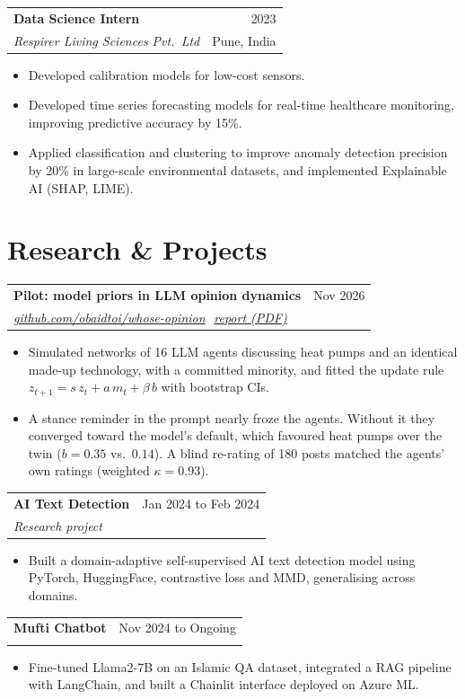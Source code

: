 \documentclass[11pt,a4paper]{article}
\makeatletter
\newcommand{\sep}{\,{\color{soft}\textperiodcentered}\,\allowbreak}
\newcommand{\entry}[4]{%
  \begin{tabularx}{\linewidth}{@{}X r@{}}
    \textbf{#1} & {\color{soft}#2}\\
    \textit{#3} & {\color{soft}\small #4}
  \end{tabularx}\par}
\newcommand{\gap}{\vspace{0.5em}}
\makeatother
\begin{document}
\gap
\entry{Data Science Intern}{2023}{Respirer Living Sciences Pvt.\ Ltd}{Pune, India}
\begin{itemize}
  \item Developed calibration models for low-cost sensors.
  \item Developed time series forecasting models for real-time healthcare monitoring, improving predictive accuracy by 15\%.
  \item Applied classification and clustering to improve anomaly detection precision by 20\% in large-scale environmental datasets, and implemented Explainable AI (SHAP, LIME).
\end{itemize}

\section{Research \& Projects}
\entry{Pilot: model priors in LLM opinion dynamics}{Nov 2026}{\href{https://github.com/obaidtoi/whose-opinion}{github.com/obaidtoi/whose-opinion} \sep \href{https://github.com/obaidtoi/whose-opinion/blob/main/reports/pilot_report.pdf}{report (PDF)}}{}
\begin{itemize}
  \item Simulated networks of 16 LLM agents discussing heat pumps and an identical made-up technology, with a committed minority, and fitted the update rule $z_{t+1} = s\,z_t + a\,m_t + \beta\,b$ with bootstrap CIs.
  \item A stance reminder in the prompt nearly froze the agents. Without it they converged toward the model's default, which favoured heat pumps over the twin ($b = 0.35$ vs.\ $0.14$). A blind re-rating of 180 posts matched the agents' own ratings (weighted $\kappa = 0.93$).
\end{itemize}
\gap
\entry{AI Text Detection}{Jan 2024 to Feb 2024}{Research project}{}
\begin{itemize}
  \item Built a domain-adaptive self-supervised AI text detection model using PyTorch, HuggingFace, contrastive loss and MMD, generalising across domains.
\end{itemize}
\gap
\entry{Mufti Chatbot}{Nov 2024 to Ongoing}{}{}
\begin{itemize}
  \item Fine-tuned Llama2-7B on an Islamic QA dataset, integrated a RAG pipeline with LangChain, and built a Chainlit interface deployed on Azure ML.
\end{itemize}
\end{document}
